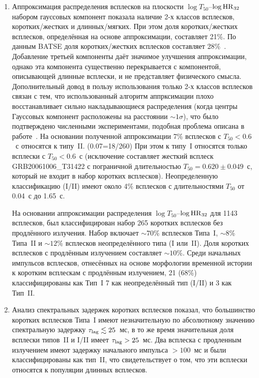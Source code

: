 \begin{enumerate}
\item Аппроксимация распределения всплесков на плоскости $\log T_{50}$--$\log {\mathrm{HR}}_{32}$ 
набором гауссовых компонент показала наличие 2-х классов всплесков, коротких/жестких 
и длинных/мягких. При этом доля коротких/жестких всплесков, определённая на основе 
аппроксимации, составляет 21\%. По данным  BATSE доля коротких/жестких всплесков 
составляет 28\%~\citep{Horvath_2002}.  
Добавление третьей компоненты даёт значимое улучшения аппроксимации, однако эта 
компонента существенно перекрывается с компонентой, описывающей длинные всплески, 
и не представляет физического смысла. Дополнительный довод в пользу использования
только 2-х классов всплесков связан с тем, что использованный алгоритм аппрксимации
плохо восстанавливает сильно накладывающиеся распределения 
(когда центры Гауссовых компонент расположены на расстоянии $\sim 1\sigma$),
что было подтверждено численными экспериментами, подобная проблема 
описана в работе~\citep{Igoshev_2013MNRAS}.
На основании полученной аппроксимации 7\% всплесков с $T_{50} < 0.6$~с относятся к типу~II.  (0.07=18/260)
При этом к типу~I относятся только всплески с $T_{50} < 0.6$~с 
(исключение составляет жесткий всплеск GRB20061006\_T31422 с пограничной  длительностью $T_{50} = 0.620\pm 0.049$~с, 
который не входит в набор коротких всплесков). Неопределенную классификацию (I/II) имеют 
около 4\% всплесков с длительностями $T_{50}$ от 0.04~с до 1.65~с.

На основании аппроксимации распределения $\log T_{50}$--$\log {\mathrm{HR}}_{32}$ 
для 1143 всплесков, был классифицирован набор 265 коротких всплесков без продлённого излучения. 
Набор включает $\sim 70$\% всплесков Типа~I, $\sim 8$\% Типа~II и $\sim 12$\%
всплесков неопределённого типа (I или~II). Доля коротких всплесков с продлённым 
излучением составляет $\sim 10$\%.
Среди начальных импульсов всплесков, отнесённых на основе морфологии временной 
истории к коротким всплескам с продлённым излучением, 21 (68\%) классифицированы как Тип~I 
7 как неопределённый тип (I/II) и 3 как Тип~II.
 
\item Анализ спектральных задержек коротких всплесков показал, что большинство коротких всплесков 
Типа~I имеют незначительную по абсолютному значению спектральную задержку $\tau_{\mathrm{lag}} \lesssim 25$~мс, 
в то же время значительная доля всплески типов~II и I/II имеет $\tau_{\mathrm{lag}} > 25$~мс. 
Два всплеска с продленным излучением имеют задержку начального импульса $> 100$~мс
и были классифицированы как тип~II, что свидетельствует о том, что
эти всплески относятся к популяции длинных всплесков.  


\end{enumerate}
